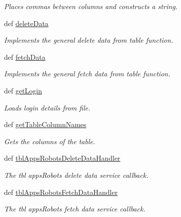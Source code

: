 \begin{DoxyCompactItemize}
\begin{DoxyCompactList}\small\item\em Places commas between columns and constructs a string. \end{DoxyCompactList}\item 
def \hyperlink{classmysql__wrapper__old_1_1MySQLdbWrapper_a605bf66617d945102550e6072f4a40cd}{delete\-Data}
\begin{DoxyCompactList}\small\item\em Implements the general delete data from table function. \end{DoxyCompactList}\item 
def \hyperlink{classmysql__wrapper__old_1_1MySQLdbWrapper_a9afe0c00bb0358e3e09085d02552e9e6}{fetch\-Data}
\begin{DoxyCompactList}\small\item\em Implements the general fetch data from table function. \end{DoxyCompactList}\item 
def \hyperlink{classmysql__wrapper__old_1_1MySQLdbWrapper_ac5b3162f215a5e618967a82bd7856e53}{get\-Login}
\begin{DoxyCompactList}\small\item\em Loads login details from file. \end{DoxyCompactList}\item 
def \hyperlink{classmysql__wrapper__old_1_1MySQLdbWrapper_a2d3b259e54280d9dcfa69d38fb6ae844}{get\-Table\-Column\-Names}
\begin{DoxyCompactList}\small\item\em Gets the columns of the table. \end{DoxyCompactList}\item 
def \hyperlink{classmysql__wrapper__old_1_1MySQLdbWrapper_ae8eaa0f2fec422aa36b267215bbd13f2}{tbl\-Apps\-Robots\-Delete\-Data\-Handler}
\begin{DoxyCompactList}\small\item\em The tbl apps\-Robots delete data service callback. \end{DoxyCompactList}\item 
def \hyperlink{classmysql__wrapper__old_1_1MySQLdbWrapper_a28d6c94ea64b2d5b4341fdc0e206778c}{tbl\-Apps\-Robots\-Fetch\-Data\-Handler}
\begin{DoxyCompactList}\small\item\em The tbl apps\-Robots fetch data service callback. \end{DoxyCompactList}\item 

\end{DoxyCompactItemize}
